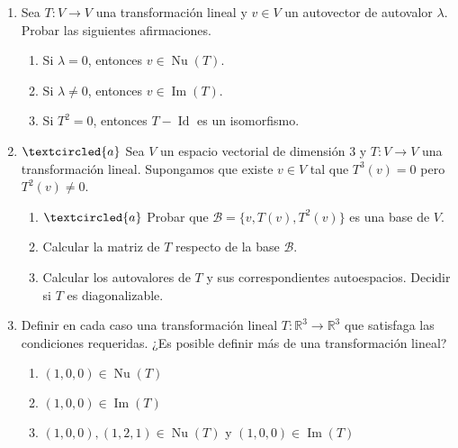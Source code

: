\begin{enumerate}[topsep=6pt, itemsep=.4cm]
\item Sea $T:V\longrightarrow V$ una transformación lineal y $v\in V$ un autovector de autovalor $\lambda$. Probar las siguientes afirmaciones.
\begin{enumerate}
    \item\label{autovalor-autovector-a} Si $\lambda=0$, entonces $v\in\operatorname{Nu}(T)$.
    \item\label{autovalor-autovector-b} Si $\lambda\neq0$, entonces $v\in\operatorname{Im}(T)$.
    \item\label{autovalor-autovector-c} Si $T^2=0$, entonces $T-\operatorname{Id}$ es un isomorfismo.
\end{enumerate}


\item\label{base nilp} $\textcircled{a}$ Sea $V$ un espacio vectorial de dimensión $3$ y $T:V\longrightarrow V$ una transformación lineal. Supongamos que existe $v\in V$ tal que $T^3(v)=0$ pero $T^2(v)\neq0$.
\begin{enumerate}
    \item\label{base nilp a} $\textcircled{a}$ Probar que $\mathcal{B}=\{v,T(v),T^2(v)\}$ es una base de $V$.
    \item\label{base nilp b} Calcular la matriz de $T$ respecto de la base $\mathcal{B}$.
    \item\label{base nilp c} Calcular los autovalores de $T$ y sus correspondientes autoespacios. Decidir si $T$ es diagonalizable.
\end{enumerate}

        
\item Definir en cada caso una transformación lineal $T:\mathbb{R}^3\longrightarrow\mathbb{R}^3$ que satisfaga las condiciones requeridas. ¿Es posible definir más de una transformación lineal?
\begin{enumerate}
    \item\label{tl-condiciones-a} $(1,0,0)\in \operatorname{Nu}(T)$ 
    \item\label{tl-condiciones-b} $(1,0,0)\in \operatorname{Im}(T)$ 
    \item\label{tl-condiciones-c} $(1,0,0),(1,2,1)\in\operatorname{Nu}(T)$ y $(1,0,0) \in  \operatorname{Im}(T)$
\end{enumerate}



\end{enumerate}
